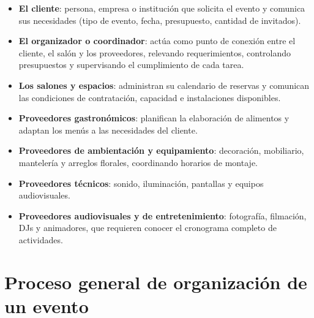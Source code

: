 \begin{itemize}
    \item \textbf{El cliente}: persona, empresa o institución que
          solicita el evento y comunica sus necesidades (tipo de evento,
          fecha, presupuesto, cantidad de invitados).
    \item \textbf{El organizador o coordinador}: actúa como punto de
          conexión entre el cliente, el salón y los proveedores,
          relevando requerimientos, controlando presupuestos y
          supervisando el cumplimiento de cada tarea.
    \item \textbf{Los salones y espacios}: administran su calendario de
          reservas y comunican las condiciones de contratación,
          capacidad e instalaciones disponibles.
    \item \textbf{Proveedores gastronómicos}: planifican la elaboración
          de alimentos y adaptan los menús a las necesidades del cliente.
    \item \textbf{Proveedores de ambientación y equipamiento}:
          decoración, mobiliario, mantelería y arreglos florales,
          coordinando horarios de montaje.
    \item \textbf{Proveedores técnicos}: sonido, iluminación, pantallas y
          equipos audiovisuales.
    \item \textbf{Proveedores audiovisuales y de entretenimiento}:
          fotografía, filmación, DJs y animadores, que requieren conocer
          el cronograma completo de actividades.
\end{itemize}

\section{Proceso general de organización de un evento}

